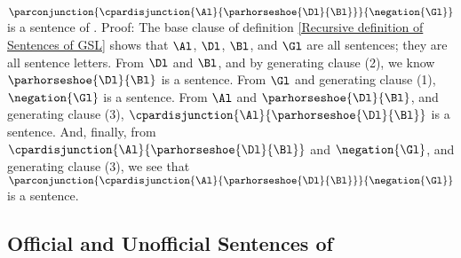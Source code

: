 \begin{majorILnc}{}
$\parconjunction{\cpardisjunction{\Al}{\parhorseshoe{\Dl}{\Bl}}}{\negation{\Gl}}$ is a sentence of \GSL{}. 
Proof: The base clause of definition \ref{Recursive definition of Sentences of GSL} shows that $\Al$, $\Dl$, $\Bl$, and $\Gl$ are all sentences; they are all sentence letters. 
From $\Dl$ and $\Bl$, and by generating clause (2), we know $\parhorseshoe{\Dl}{\Bl}$ is a sentence. 
From $\Gl$ and generating clause (1), $\negation{\Gl}$ is a sentence. 
From $\Al$ and $\parhorseshoe{\Dl}{\Bl}$, and generating clause (3), $\cpardisjunction{\Al}{\parhorseshoe{\Dl}{\Bl}}$ is a sentence. 
And, finally, from $\cpardisjunction{\Al}{\parhorseshoe{\Dl}{\Bl}}$ and $\negation{\Gl}$, and generating clause (3), we see that $\parconjunction{\cpardisjunction{\Al}{\parhorseshoe{\Dl}{\Bl}}}{\negation{\Gl}}$ is a sentence. 
\end{majorILnc}

\subsection{Official and Unofficial Sentences of \GSL{}}\label{Unofficial Sentences of GSL}

